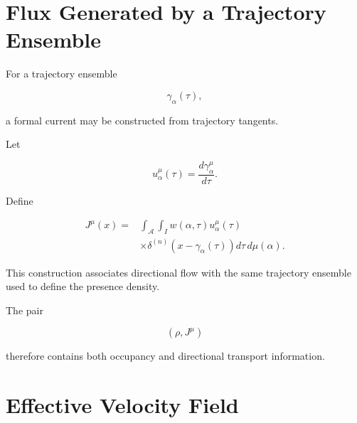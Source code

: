 \documentclass[12pt,oneside]{book}
\begin{document}

\section{Flux Generated by a Trajectory Ensemble}
\label{sec:ensemble-flux}

For a trajectory ensemble

\begin{equation}
    \gamma_\alpha(\tau),
\end{equation}

a formal current may be constructed from trajectory tangents.

Let

\begin{equation}
    u_\alpha^\mu(\tau)
    =
    \frac{d\gamma_\alpha^\mu}{d\tau}.
\end{equation}

Define

\begin{equation}
\begin{aligned}
    J^\mu(x)
    ={}&
    \int_{\mathcal{A}}
    \int_I
        w(\alpha,\tau)
        u_\alpha^\mu(\tau)
        \\
        &\times
        \delta^{(n)}
        \left(
            x-\gamma_\alpha(\tau)
        \right)
    d\tau
    \,d\mu(\alpha).
\end{aligned}
\label{eq:ensemble-current}
\end{equation}

This construction associates directional flow with the same
trajectory ensemble used to define the presence density.

The pair

\begin{equation}
    \left(
        \rho,
        J^\mu
    \right)
\end{equation}

therefore contains both occupancy and directional transport
information.


\section{Effective Velocity Field}
\label{sec:effective-velocity-field}
\end{document}
